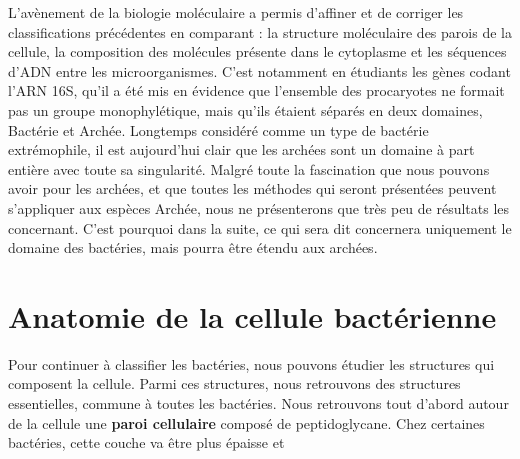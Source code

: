 L'avènement de la biologie moléculaire a permis d'affiner et de corriger les classifications précédentes en comparant : la structure moléculaire des parois de la cellule, la composition des molécules présente dans le cytoplasme et les séquences d'ADN entre les microorganismes. C'est notamment en étudiants les gènes codant l'ARN 16S, qu'il a été mis en évidence que l'ensemble des procaryotes ne formait pas un groupe monophylétique, mais qu'ils étaient séparés en deux domaines, Bactérie et Archée. Longtemps considéré comme un type de bactérie extrémophile, il est aujourd'hui clair que les archées sont un domaine à part entière avec toute sa singularité. Malgré toute la fascination que nous pouvons avoir pour les archées, et que toutes les méthodes qui seront présentées peuvent s'appliquer aux espèces Archée, nous ne présenterons que très peu de résultats les concernant. C'est pourquoi dans la suite, ce qui sera dit concernera uniquement le domaine des bactéries, mais pourra être étendu aux archées.

\section{Anatomie de la cellule bactérienne}

Pour continuer à classifier les bactéries, nous pouvons étudier les structures qui composent la cellule. Parmi ces structures, nous retrouvons des structures essentielles, commune à toutes les bactéries. Nous retrouvons tout d'abord autour de la cellule une \textbf{paroi cellulaire} composé de peptidoglycane. Chez certaines bactéries, cette couche va être plus épaisse et

